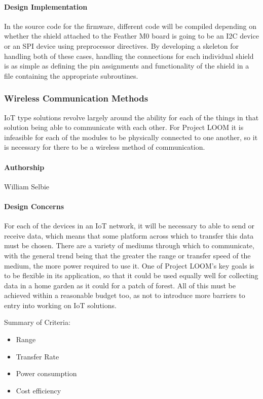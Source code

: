 \documentclass[onecolumn, draftclsnofoot,10pt, compsoc]{IEEEtran}
\begin{document}
\paragraph{Design Implementation}
    In the source code for the firmware, different code will be compiled depending on whether the shield attached to the Feather M0 board is going to be an I2C device or an SPI device using preprocessor directives. By developing a skeleton for handling both of these cases, handling the connections for each individual shield is as simple as defining the pin assignments and functionality of the shield in a file containing the appropriate subroutines.


\subsubsection{Wireless Communication Methods}
    IoT type solutions revolve largely around the ability for each of the things in that solution being able to communicate with each other. For Project LOOM it is infeasible for each of the modules to be physically connected to one another, so it is necessary for there to be a wireless method of communication. 

\paragraph{Authorship}
    William Selbie

\paragraph{Design Concerns}
    For each of the devices in an IoT network, it will be necessary to able to send or receive data, which means that some platform across which to transfer this data must be chosen. There are a variety of mediums through which to communicate, with the general trend being that the greater the range or transfer speed of the medium, the more power required to use it. One of Project LOOM's key goals is to be flexible in its application, so that it could be used equally well for collecting data in a home garden as it could for a patch of forest. All of this must be achieved within a reasonable budget too, as not to introduce more barriers to entry into working on IoT solutions. 

    Summary of Criteria:
    \begin{itemize}[noitemsep,topsep=-10pt]
        \item Range
        \item Transfer Rate
        \item Power consumption
        \item Cost efficiency
    \end{itemize}
\end{document}
